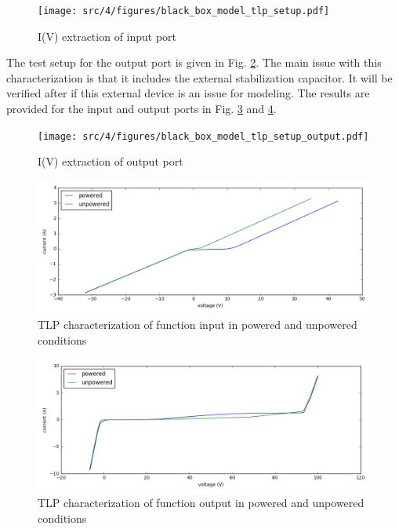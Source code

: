 \begin{figure}[!h]
  \centering
  \texttt{[image: src/4/figures/black\_box\_model\_tlp\_setup.pdf]}
  \caption{I(V) extraction of input port}
  \label{fig:tlp-input-testbench}
\end{figure}

The test setup for the output port is given in Fig. \ref{fig:tlp-output-testbench}.
The main issue with this characterization is that it includes the external stabilization capacitor.
It will be verified after if this external device is an issue for modeling.
The results are provided for the input and output ports in Fig. \ref{fig:tlp-input-cz} and \ref{fig:tlp-output-cz}.

\begin{figure}[!h]
  \centering
  \texttt{[image: src/4/figures/black\_box\_model\_tlp\_setup\_output.pdf]}
  \caption{I(V) extraction of output port}
  \label{fig:tlp-output-testbench}
\end{figure}

\begin{figure}[!h]
  \centering
  \includegraphics[width=\textwidth]{src/4/figures/tlp_input_characterization.png}
  \caption{TLP characterization of function input in powered and unpowered conditions}
  \label{fig:tlp-input-cz}
\end{figure}

\begin{figure}[!h]
  \centering
  \includegraphics[width=\textwidth]{src/4/figures/tlp_output_characterization.png}
  \caption{TLP characterization of function output in powered and unpowered conditions}
  \label{fig:tlp-output-cz}
\end{figure}

